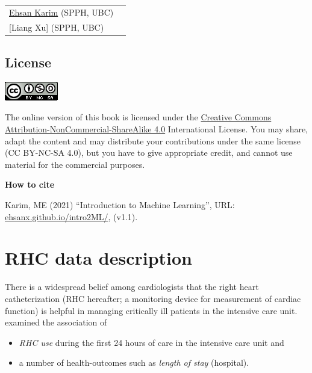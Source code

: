 \documentclass[
]{book}
\providecommand{\tightlist}{%
  \setlength{\itemsep}{0pt}\setlength{\parskip}{0pt}}
\begin{document}
\begin{longtable}[]{@{}ll@{}}
\toprule
& \\
\midrule
\endhead
\href{https://ehsank.com/}{Ehsan Karim} (SPPH, UBC) & \\
{[}Liang Xu{]} (SPPH, UBC) & \\
\bottomrule
\end{longtable}

\hypertarget{license}{%
\section*{License}\label{license}}

\includegraphics[width=0.25\linewidth]{images/by-nc-sa}

The online version of this book is licensed under the \href{https://creativecommons.org/licenses/by-nc-sa/4.0/}{Creative Commons Attribution-NonCommercial-ShareAlike 4.0} International License. You may share, adapt the content and may distribute your contributions under the same license (CC BY-NC-SA 4.0), but you have to give appropriate credit, and cannot use material for the commercial purposes.

\begin{rmdcomment}
\textbf{How to cite}

Karim, ME (2021) ``Introduction to Machine Learning'', URL:
\href{https://ehsanx.github.io/intro2ML/}{ehsanx.github.io/intro2ML/},
(v1.1).
\end{rmdcomment}

\hypertarget{rhc-data-description}{%
\chapter{RHC data description}\label{rhc-data-description}}

There is a widespread belief among cardiologists that the right heart catheterization (RHC hereafter; a monitoring device for measurement of cardiac function) is helpful in managing critically ill patients in the intensive care unit. \citet{connors1996effectiveness} examined the association of

\begin{itemize}
\tightlist
\item
  \emph{RHC use} during the first 24 hours of care in the intensive care unit and
\item
  a number of health-outcomes such as \emph{length of stay} (hospital).
\end{itemize}
\end{document}
